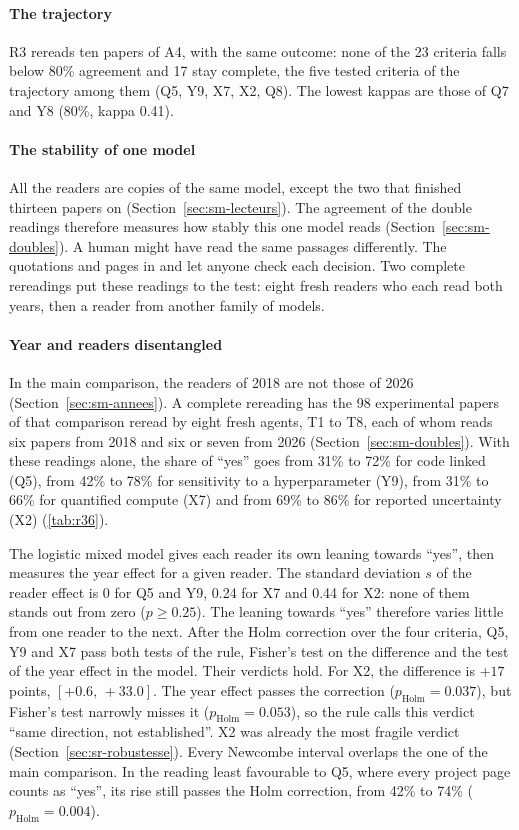 \paragraph{The trajectory}
R3 rereads ten papers of A4, with the same outcome: none of the 23 criteria falls below 80\% agreement
and 17 stay complete, the five tested criteria of the trajectory among them (Q5, Y9, X7, X2, Q8). The lowest
kappas are those of Q7 and Y8 (80\%, kappa 0.41).

\paragraph{The stability of one model}
All the readers are copies of the same model, except the two that finished thirteen papers on
 (Section~\ref{sec:sm-lecteurs}). The agreement of the double readings therefore
measures how stably this one model reads (Section~\ref{sec:sm-doubles}). A human might have read the same
passages differently. The quotations and pages in  and  let
anyone check each decision. Two complete rereadings put these readings to the test:
eight fresh readers who each read both years, then a reader from another family of models.

\paragraph{Year and readers disentangled}\label{sec:sr-annees}
In the main comparison, the readers of 2018 are not those of 2026 (Section~\ref{sec:sm-annees}).
A complete rereading has the 98 experimental papers of that comparison reread by eight fresh agents, T1 to T8,
each of whom reads six papers from 2018 and six or seven from 2026 (Section~\ref{sec:sm-doubles}). With
these readings alone, the share of \enquote{yes} goes from 31\% to 72\% for code linked (Q5), from 42\%
to 78\% for sensitivity to a hyperparameter (Y9), from 31\% to 66\% for quantified compute (X7) and from
69\% to 86\% for reported uncertainty (X2) (\cref{tab:r36}).


The logistic mixed model gives each reader its own leaning towards \enquote{yes}, then measures the
year effect for a given reader. The standard deviation $s$ of the reader effect is 0 for Q5 and Y9, 0.24 for X7 and 0.44
for X2: none of them stands out from zero ($p \geq 0.25$). The leaning towards \enquote{yes} therefore
varies little from one reader to the next. After the Holm correction over the four criteria, Q5, Y9
and X7 pass both tests of the rule, Fisher's test on the difference and the test of the year
effect in the model. Their verdicts hold. For X2, the difference is $+17$ points, $[+0.6,\,+33.0]$.
The year effect passes the correction ($p_{\text{Holm}} = 0.037$), but Fisher's test narrowly misses it
($p_{\text{Holm}} = 0.053$), so the rule calls this verdict \enquote{same direction, not established}.
X2 was already the most fragile verdict (Section~\ref{sec:sr-robustesse}). Every Newcombe interval
overlaps the one of the main comparison. In the reading least favourable to Q5, where every project
page counts as \enquote{yes}, its rise still passes the Holm correction, from 42\% to 74\%
($p_{\text{Holm}} = 0.004$).

